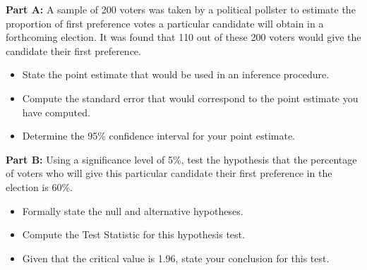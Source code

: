 \documentclass[]{article}
\begin{document}
\textbf{Part A:} A sample of 200 voters was taken by a political pollster to estimate the proportion of first preference votes a 
particular candidate will obtain in a forthcoming election. 
It was found that 110 out of these 200 voters would give the candidate their first preference.


\begin{itemize}
\item  State the point estimate that would be used in an inference procedure.
\item  Compute the standard error that would correspond to the point estimate you have computed.
\item  Determine the 95\% confidence interval for your point estimate.
\end{itemize}

\noindent \textbf{Part B:} Using a significance level of 5\%, test the hypothesis that the percentage of voters who will give this 
particular candidate their first preference in the election is 60\%.{\tiny } 

\begin{itemize}
\item  Formally state the null and alternative hypotheses.
\item  Compute the Test Statistic for this hypothesis test.
\item  Given that the critical value is 1.96, state your conclusion for this test.
\end{itemize}
\end{document}
